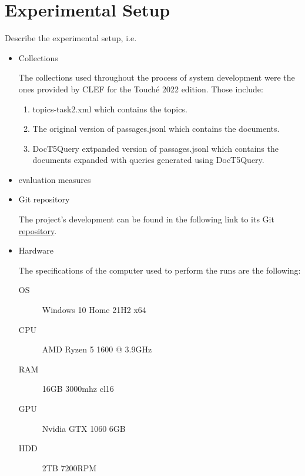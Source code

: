 \section{Experimental Setup}
\label{sec:setup}

Describe the experimental setup, i.e.
\begin{itemize}
	\item Collections
	
	The collections used throughout the process of system development were the ones provided by CLEF for the Touché 2022 edition. Those include:
	
	\begin{enumerate}
	    \item topics-task2.xml which contains the topics.
	    \item The original version of passages.jsonl which contains the documents.
	    \item DocT5Query extpanded version of passages.jsonl which contains the documents expanded with queries generated using DocT5Query.
	\end{enumerate}
	\item evaluation measures
	
	
	\item Git repository
	
	The project’s development can be found in the following link to its Git \href{https://bitbucket.org/upd-dei-stud-prj/seupd2122-kueri/src/master/}{repository}.
	\item Hardware
	
        The specifications of the computer used to perform the runs are the following:
        \begin{description}
        	\item[OS] Windows 10 Home 21H2 x64
        	\item[CPU] AMD Ryzen 5 1600 @ 3.9GHz
        	\item[RAM] 16GB 3000mhz cl16
        	\item[GPU] Nvidia GTX 1060 6GB
        	\item[HDD] 2TB 7200RPM
        \end{description}
\end{itemize}